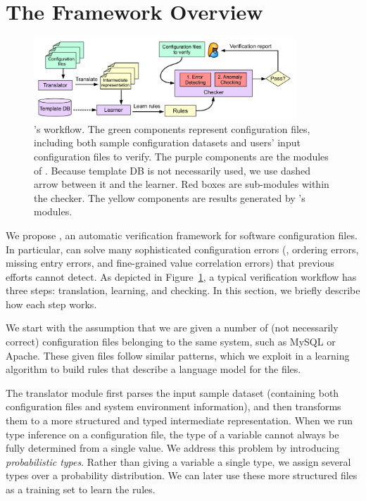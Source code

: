 
\section{The \app Framework Overview}

\begin{figure}[tbp] \centering
\includegraphics[width=0.88\textwidth]{figs/overview}
\caption{\app's workflow. The green components represent configuration 
  files, including both sample configuration datasets and users' input
  configuration files to verify. 
  The purple components are the modules of \app.
  Because template DB is not necessarily used, we use dashed
  arrow between it and the learner.
  Red boxes are sub-modules within the checker.
  The yellow components are results generated by \app's modules.}
\label{fig-overview}
\end{figure}

We propose \app, an automatic verification framework for 
software configuration files.
In particular, \app can solve many sophisticated 
configuration errors (\eg, ordering errors, missing entry errors,
and fine-grained value correlation errors) that previous efforts cannot 
detect. As depicted in Figure~\ref{fig-overview}, 
a typical \app verification workflow has three steps:
translation, learning, and checking. In this section, we briefly
describe how each step works.

We start with the assumption 
that we are given a number of (not necessarily correct) 
configuration files belonging to the same system, 
such as MySQL or Apache. 
These given files follow similar patterns, which we exploit
in a learning algorithm to build rules that
describe a language model for the files.

The translator module first parses the input sample 
dataset (containing both configuration files and system environment
information), and then transforms them to a more structured
and typed intermediate representation.
When we run type inference on a configuration file, 
the type of a variable cannot always be fully determined from 
a single value.
We address this problem 
by introducing {\em probabilistic types}.
Rather than giving a variable a single type, 
we assign several types over a probability distribution. 
We can later use these more structured files
as a training set to learn the rules. 

